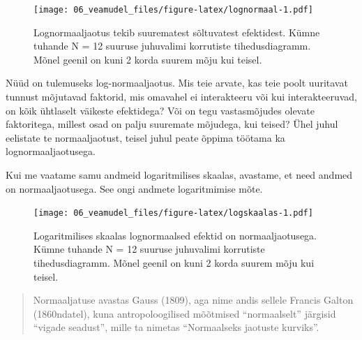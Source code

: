 \documentclass[]{book}
\newenvironment{Shaded}{\begin{snugshade}}{\end{snugshade}}
\newcommand{\DataTypeTok}[1]{\textcolor[rgb]{0.13,0.29,0.53}{#1}}
\newcommand{\DecValTok}[1]{\textcolor[rgb]{0.00,0.00,0.81}{#1}}
\newcommand{\KeywordTok}[1]{\textcolor[rgb]{0.13,0.29,0.53}{\textbf{#1}}}
\newcommand{\NormalTok}[1]{#1}
\newcommand{\OperatorTok}[1]{\textcolor[rgb]{0.81,0.36,0.00}{\textbf{#1}}}
\newcommand{\StringTok}[1]{\textcolor[rgb]{0.31,0.60,0.02}{#1}}
\begin{document}
\begin{figure}
\centering
\texttt{[image: 06\_veamudel\_files/figure-latex/lognormaal-1.pdf]}
\caption{\label{fig:lognormaal}Lognormaaljaotus tekib suurematest sõltuvatest efektidest. Kümne tuhande N = 12 suuruse juhuvalimi korrutiste tihedusdiagramm. Mõnel geenil on kuni 2 korda suurem mõju kui teisel.}
\end{figure}

Nüüd on tulemuseks log-normaaljaotus. Mis teie arvate, kas teie poolt uuritavat tunnust mõjutavad faktorid, mis omavahel ei interakteeru või kui interakteeruvad, on kõik ühtlaselt väikeste efektidega?
Või on tegu vastasmõjudes olevate faktoritega, millest osad on palju suuremate mõjudega, kui teised?
Ühel juhul eelistate te normaaljaotust, teisel juhul peate õppima töötama ka lognormaaljaotusega.

Kui me vaatame samu andmeid logaritmilises skaalas, avastame, et need andmed on normaaljaotusega.
See ongi andmete logaritmimise mõte.



\begin{Shaded}
\end{Shaded}

\begin{figure}
\centering
\texttt{[image: 06\_veamudel\_files/figure-latex/logskaalas-1.pdf]}
\caption{\label{fig:logskaalas}Logaritmilises skaalas lognormaalsed efektid on normaaljaotusega. Kümne tuhande N = 12 suuruse juhuvalimi korrutiste tihedusdiagramm. Mõnel geenil on kuni 2 korda suurem mõju kui teisel.}
\end{figure}

\begin{quote}
Normaaljatuse avastas Gauss (1809), aga nime andis sellele Francis Galton (1860ndatel), kuna antropoloogilised mõõtmised ``normaalselt'' järgisid ``vigade seadust'', mille ta nimetas ``Normaalseks jaotuste kurviks''.
\end{quote}
\end{document}
